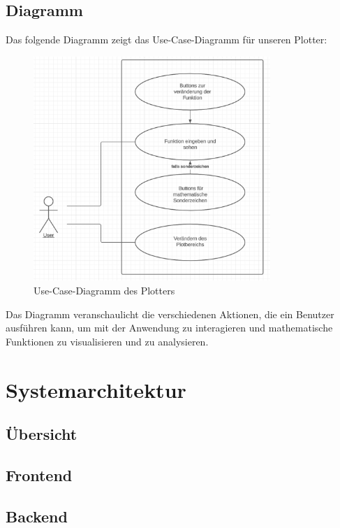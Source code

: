 \documentclass[a4paper]{article}
\begin{document}
\subsection{Diagramm}

Das folgende Diagramm zeigt das Use-Case-Diagramm für unseren Plotter:

\begin{figure}[h]
\centering
\includegraphics[width=0.8\textwidth]{Resources/use-case-diagram.png}
\caption{Use-Case-Diagramm des Plotters}
\label{fig:use_case_diagram}
\end{figure}

Das Diagramm veranschaulicht die verschiedenen Aktionen, die ein Benutzer ausführen kann, um mit der Anwendung zu interagieren und mathematische Funktionen zu visualisieren und zu analysieren.

\section{Systemarchitektur}

\subsection{Übersicht}

\subsection{Frontend}

\subsection{Backend}
\end{document}
